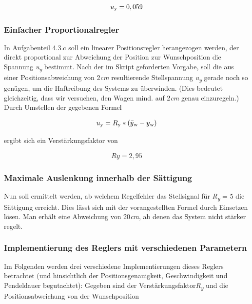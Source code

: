 \documentclass[10pt]{scrartcl}
\begin{document}
\begin {align}
 u\textsubscript{y} = 0,059 
\end{align}


\subsubsection {Einfacher Proportionalregler}
In Aufgabenteil 4.3.c soll ein linearer Positionsregler herangezogen werden, der direkt proportional zur Abweichung der Position zur Wunschposition die Spannung \textit{ u\textsubscript{y}} bestimmt.
Nach der im Skript geforderten Vorgabe, soll die aus einer Positionsabweichung von 2\textit{cm} resultierende Stellspannung \textit{ u\textsubscript{y}} gerade noch so genügen, um die Haftreibung des Systems zu überwinden. (Dies bedeutet gleichzeitig, dass wir versuchen, den Wagen mind. auf 2\textit{cm} genau einzuregeln.) 
Durch Umstellen der gegebenen Formel 

\begin {align}
u\textsubscript{y}=R\textsubscript{y}*(\bar{y}\textsubscript{w}-y\textsubscript{w}) 
\end{align}

ergibt sich ein Verstärkungsfaktor von 

\begin {align}
Ry=2,95
\end{align}


\subsubsection {Maximale Auslenkung innerhalb der Sättigung}

Nun soll ermittelt werden, ab welchem Regelfehler das Stellsignal für 
\textit{R\textsubscript{y}} = 5 die Sättigung erreicht. 
Dies lässt sich mit der vorangestellten Formel durch Einsetzen lösen. 
Man erhält eine Abweichung von 20\textit{cm}, ab denen das System nicht stärker regelt.


\subsubsection {Implementierung des Reglers mit verschiedenen Parametern}

Im Folgenden werden drei verschiedene Implementierungen dieses Reglers betrachtet (und hinsichtlich der Positionsgenauigkeit, Geschwindigkeit und Pendeldauer begutachtet):\newline
Gegeben sind der Verstärkungsfaktor\textit{R\textsubscript{y}} und die Positionsabweichung von der Wunschposition
\end{document}
